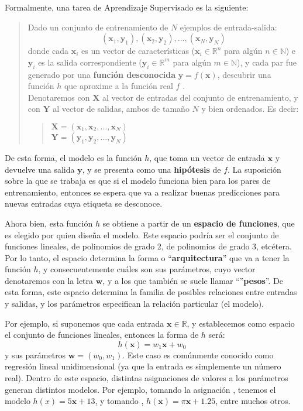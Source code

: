 \documentclass[../../main.tex]{subfiles}
\begin{document}
Formalmente, una tarea de Aprendizaje Supervisado es la siguiente:
\begin{quote}
    Dado un conjunto de entrenamiento de \(N\) ejemplos de entrada-salida:
    \[(\mathbf{x}_1, \mathbf{y}_1), (\mathbf{x}_2, \mathbf{y}_2), ..., (\mathbf{x}_N,
    \mathbf{y}_N)\] donde cada \(\mathbf{x}_i\) es un vector de características
    (\(\mathbf{x}_i \in \mathbb{R}^n\) para algún \(n \in \mathbb{N}\)) e \(\mathbf{y}_i\)
    es la salida correspondiente (\(\mathbf{y}_i \in \mathbb{R}^m\) para algún \(m \in
    \mathbb{N}\)), y cada par fue generado por una \textbf{función desconocida}
    \(\mathbf{\mathbf{y}}=f(\mathbf{x})\), descubrir una función \(h\) que aproxime a la
    función real \(f\) \cite{ai-a-modern-approach}.\\
    Denotaremos con \(\mathbf{X}\) al vector de entradas del conjunto de entrenamiento, y
    con \(\mathbf{Y}\) al vector de salidas, ambos de tamaño \(N\) y bien ordenados. Es
    decir:
    \begin{quote}
        \(\mathbf{X}=(\mathbf{x}_1, \mathbf{x}_2, ..., \mathbf{x}_N)\)\\
        \(\mathbf{Y}=(\mathbf{y}_1, \mathbf{y}_2, ..., \mathbf{y}_N)\)
    \end{quote}
\end{quote}
De esta forma, el modelo es la función \(h\), que toma un vector de entrada \(\mathbf{x}\)
y devuelve una salida \(\mathbf{y}\), y se presenta como una \textbf{hipótesis} de \(f\).
La suposición sobre la que se trabaja es que si el modelo funciona bien para los pares de
entrenamiento, entonces se espera que va a realizar buenas predicciones para nuevas
entradas cuya etiqueta se desconoce.

Ahora bien, esta función \(h\) se obtiene a partir de un \textbf{espacio de funciones},
que es elegido por quien diseña el modelo. Este espacio podría ser el conjunto de
funciones lineales, de polinomios de grado 2, de polinomios de grado 3, etcétera. Por lo
tanto, el espacio determina la forma o ``\textbf{arquitectura}'' que va a tener la función
\(h\), y consecuentemente cuáles son sus parámetros, cuyo vector denotaremos con la letra
\(\bm{\bm{w}}\), y a los que también se suele llamar ``''\textbf{pesos}''. De esta forma,
este espacio determina la familia de posibles relaciones entre entradas y salidas, y los
parámetros especifican la relación particular (el modelo).

Por ejemplo, si suponemos que cada entrada \(\mathbf{x} \in \mathbb{R}\), y establecemos
como espacio el conjunto de funciones lineales, entonces la forma de \(h\) será:
\[h(\mathbf{x}) = w_1 \mathbf{x} + w_0\] y sus parámetros \(\bm{w}=(w_0, w_1)\). Este caso
es comúnmente conocido como regresión lineal unidimensional (ya que la entrada es
simplemente un número real). Dentro de este espacio, distintas asignaciones de valores
a los parámetros generan distintos modelos. Por ejemplo, tomando la asignación
\(\), tenemos el modelo \(h(x) = 5\mathbf{x} + 13\), y tomando \(\),
\(h(\mathbf{x}) = \pi \mathbf{x} + 1.25\), entre muchos otros.
\end{document}
